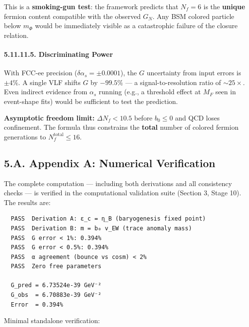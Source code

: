 \documentclass[
  11pt,
]{article}
\begin{document}
This is a \textbf{smoking-gun test}: the framework predicts that
\(N_f = 6\) is the \textbf{unique} fermion content compatible with the
observed \(G_N\). Any BSM colored particle below \(m_\Phi\) would be
immediately visible as a catastrophic failure of the closure relation.

\hypertarget{discriminating-power}{%
\paragraph{5.11.11.5. Discriminating Power}\label{discriminating-power}}

With FCC-ee precision (\(\delta\alpha_s = \pm 0.0001\)), the \(G\)
uncertainty from input errors is \(\pm 4\%\). A single VLF shifts \(G\)
by \(-99.5\%\) --- a signal-to-resolution ratio of \(\sim 25\times\).
Even indirect evidence from \(\alpha_s\) running (e.g., a threshold
effect at \(M_F\) seen in event-shape fits) would be sufficient to test
the prediction.

\textbf{Asymptotic freedom limit:} \(\Delta N_f < 10.5\) before
\(b_0 \leq 0\) and QCD loses confinement. The formula thus constrains
the \textbf{total} number of colored fermion generations to
\(N_f^{\text{total}} \leq 16\).

\bigskip

\hypertarget{a.-appendix-a-numerical-verification}{%
\subsection{5.A. Appendix A: Numerical
Verification}\label{a.-appendix-a-numerical-verification}}

The complete computation --- including both derivations and all
consistency checks --- is verified in the computational validation suite
(Section 3, Stage 10). The results are:

\begin{verbatim}
  PASS  Derivation A: ε_c = η_B (baryogenesis fixed point)
  PASS  Derivation B: m = b₀ v_EW (trace anomaly mass)
  PASS  G error < 1%: 0.394%
  PASS  G error < 0.5%: 0.394%
  PASS  α agreement (bounce vs cosm) < 2%
  PASS  Zero free parameters

  G_pred = 6.73524e-39 GeV⁻²
  G_obs  = 6.70883e-39 GeV⁻²
  Error  = 0.394%
\end{verbatim}

Minimal standalone verification:
\end{document}
